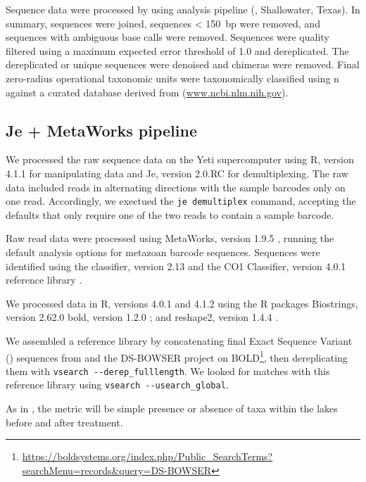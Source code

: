 \begin{multicols}{2}
Sequence data were processed by using  analysis pipeline (, Shallowater, Texas).  In summary, sequences were joined, sequences < 150~bp were removed, and sequences with ambiguous base calls were removed. Sequences were quality filtered using a maximum expected error threshold of 1.0 and dereplicated. The dereplicated or unique sequences were denoised and chimeras were removed. Final zero-radius operational taxonomic units were taxonomically classified using n against a curated database derived from  (\url{www.ncbi.nlm.nih.gov}).   

\subsection{Je + MetaWorks pipeline}

We processed the raw sequence data on the  Yeti supercomputer \citep{USGSARC2021} using R, version 4.1.1 for manipulating data and Je, version 2.0.RC \citep{Girardotetal2016} for demultiplexing. The raw data included reads in alternating directions with the sample barcodes only on one read. Accordingly, we exectued the \verb|je demultiplex| command, accepting the defaults that only require one of the two reads to contain a sample barcode.

Raw read data were processed using MetaWorks, version 1.9.5 \citep{PorterHajibabaei2020}, running the default analysis options for metazoan   barcode sequences. Sequences were identified using the  classifier, version 2.13 \citep{Wangetal2007} and the CO1 Classifier, version 4.0.1 reference library \citep{Porter2017, PorterHajibabaei2018}. 

We processed data in R, versions 4.0.1 and 4.1.2 \citep{RCoreTeam2021} using the R packages Biostrings, version 2.62.0 \citep{Pagesetal2021} bold, version 1.2.0 \citep{Chamberlain2021}; and reshape2, version 1.4.4 \citep{Wickham2007}.

We assembled a reference library by concatenating final Exact Sequence Variant () sequences from \citet{Bowseretal2020, BowserBowser2020} and the DS-BOWSER project on BOLD\footnote{\url{https://boldsystems.org/index.php/Public_SearchTerms?searchMenu=records&query=DS-BOWSER}}, then dereplicating them with \verb|vsearch --derep_fulllength|. We looked for matches with this reference library using \verb|vsearch --usearch_global|.

As in \citet{Massengill2014, Massengill2017}, the metric will be simple presence or absence of taxa within the lakes before and after treatment.


\end{multicols}

